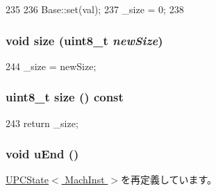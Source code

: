 \begin{DoxyCode}
235         {
236             Base::set(val);
237             _size = 0;
238         }
\end{DoxyCode}
\hypertarget{classX86ISA_1_1PCState_a8f6acca1b2ed4d3f1f51c8711e91be2e}{
\subsubsection[{size}]{\setlength{\rightskip}{0pt plus 5cm}void size (uint8\_\-t {\em newSize})}}
\label{classX86ISA_1_1PCState_a8f6acca1b2ed4d3f1f51c8711e91be2e}



\begin{DoxyCode}
244 { _size = newSize; }
\end{DoxyCode}
\hypertarget{classX86ISA_1_1PCState_a9a3afed8ccfa04ad21f51926ad1dae6a}{
\subsubsection[{size}]{\setlength{\rightskip}{0pt plus 5cm}uint8\_\-t size () const}}
\label{classX86ISA_1_1PCState_a9a3afed8ccfa04ad21f51926ad1dae6a}



\begin{DoxyCode}
243 { return _size; }
\end{DoxyCode}
\hypertarget{classX86ISA_1_1PCState_a2f3cdfc88ed61928bd28242996e0f86e}{
\subsubsection[{uEnd}]{\setlength{\rightskip}{0pt plus 5cm}void uEnd ()}}
\label{classX86ISA_1_1PCState_a2f3cdfc88ed61928bd28242996e0f86e}


\hyperlink{classGenericISA_1_1UPCState_a2f3cdfc88ed61928bd28242996e0f86e}{UPCState$<$ MachInst $>$}を再定義しています。


